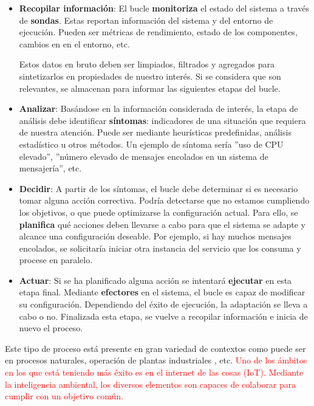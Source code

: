 \begin{itemize}
  \item \textbf{Recopilar información}: El bucle \textbf{monitoriza} el estado del sistema a través de \textbf{sondas}. Estas reportan información del sistema y del entorno de ejecución. Pueden ser métricas de rendimiento, estado de los componentes, cambios en en el entorno, etc.

  Estos datos en bruto deben ser limpiados, filtrados y agregados para sintetizarlos en propiedades de nuestro interés. Si se considera que son relevantes, se almacenan para informar las siguientes etapas del bucle.

  \item \textbf{Analizar}: Basándose en la información considerada de interés, la etapa de análisis debe identificar \textbf{síntomas}: indicadores de una situación que requiera de nuestra atención. Puede ser mediante heurísticas predefinidas, análisis estadístico u otros métodos. Un ejemplo de síntoma sería ''uso de CPU elevado'', ''número elevado de mensajes encolados en un sistema de mensajería'', etc.

  \item \textbf{Decidir}: A partir de los síntomas, el bucle debe determinar si es necesario tomar alguna acción correctiva. Podría detectarse que no estamos cumpliendo los objetivos, o que puede optimizarse la configuración actual. Para ello, se \textbf{planifica} qué acciones deben llevarse a cabo para que el sistema se adapte y alcance una configuración deseable. Por ejemplo, si hay muchos mensajes encolados, se solicitaría iniciar otra instancia del servicio que los consuma y procese en paralelo.

  \item \textbf{Actuar}: Si se ha planificado alguna acción se intentará \textbf{ejecutar} en esta etapa final. Mediante \textbf{efectores} en el sistema, el bucle es capaz de modificar su configuración. Dependiendo del éxito de ejecución, la adaptación se lleva a cabo o no. Finalizada esta etapa, se vuelve a recopilar información e inicia de nuevo el proceso.
\end{itemize}

Este tipo de proceso está presente en gran variedad de contextos como puede ser en procesos naturales, operación de plantas industriales \cite{climentpenadesDissenyPrototipatSolucions2020a}, etc. \textcolor{red}{Uno de los ámbitos en los que está teniendo más éxito es en el internet de las cosas (IoT). \cite{savaglioAgentbasedInternetThings2020} Mediante la inteligencia ambiental, los diversos elementos son capaces de colaborar para cumplir con un objetivo común.}

